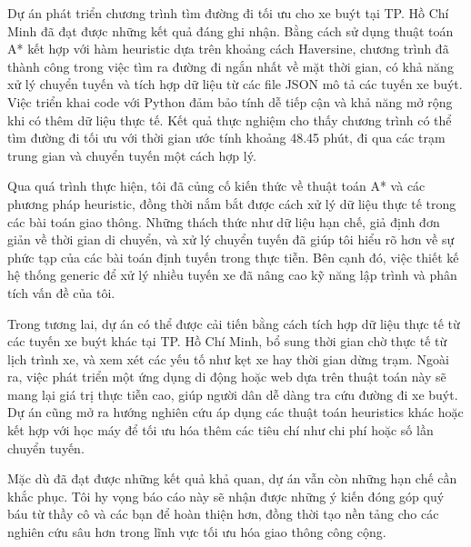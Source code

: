 \documentclass[a4paper,12pt]{article}
\begin{document}
Dự án phát triển chương trình tìm đường đi tối ưu cho xe buýt tại TP. Hồ Chí Minh đã đạt được những kết quả đáng ghi nhận. Bằng cách sử dụng thuật toán A* kết hợp với hàm heuristic dựa trên khoảng cách Haversine, chương trình đã thành công trong việc tìm ra đường đi ngắn nhất về mặt thời gian, có khả năng xử lý chuyển tuyến và tích hợp dữ liệu từ các file JSON mô tả các tuyến xe buýt. Việc triển khai code với Python đảm bảo tính dễ tiếp cận và khả năng mở rộng khi có thêm dữ liệu thực tế. Kết quả thực nghiệm cho thấy chương trình có thể tìm đường đi tối ưu với thời gian ước tính khoảng 48.45 phút, đi qua các trạm trung gian và chuyển tuyến một cách hợp lý.

Qua quá trình thực hiện, tôi đã củng cố kiến thức về thuật toán A* và các phương pháp heuristic, đồng thời nắm bắt được cách xử lý dữ liệu thực tế trong các bài toán giao thông. Những thách thức như dữ liệu hạn chế, giả định đơn giản về thời gian di chuyển, và xử lý chuyển tuyến đã giúp tôi hiểu rõ hơn về sự phức tạp của các bài toán định tuyến trong thực tiễn. Bên cạnh đó, việc thiết kế hệ thống generic để xử lý nhiều tuyến xe đã nâng cao kỹ năng lập trình và phân tích vấn đề của tôi.

Trong tương lai, dự án có thể được cải tiến bằng cách tích hợp dữ liệu thực tế từ các tuyến xe buýt khác tại TP. Hồ Chí Minh, bổ sung thời gian chờ thực tế từ lịch trình xe, và xem xét các yếu tố như kẹt xe hay thời gian dừng trạm. Ngoài ra, việc phát triển một ứng dụng di động hoặc web dựa trên thuật toán này sẽ mang lại giá trị thực tiễn cao, giúp người dân dễ dàng tra cứu đường đi xe buýt. Dự án cũng mở ra hướng nghiên cứu áp dụng các thuật toán heuristics khác hoặc kết hợp với học máy để tối ưu hóa thêm các tiêu chí như chi phí hoặc số lần chuyển tuyến.

Mặc dù đã đạt được những kết quả khả quan, dự án vẫn còn những hạn chế cần khắc phục. Tôi hy vọng báo cáo này sẽ nhận được những ý kiến đóng góp quý báu từ thầy cô và các bạn để hoàn thiện hơn, đồng thời tạo nền tảng cho các nghiên cứu sâu hơn trong lĩnh vực tối ưu hóa giao thông công cộng.
\end{document}
